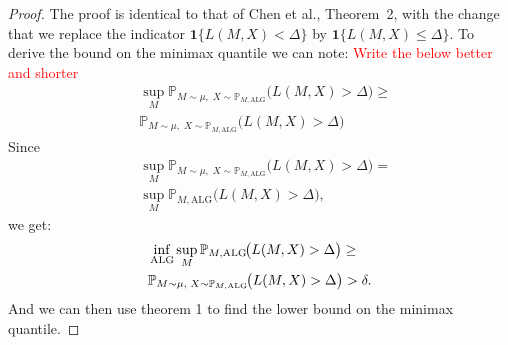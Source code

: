 \documentclass[conference]{IEEEtran}
\newtheorem{definition}{Definition}
\begin{document}
\begin{proof}
The proof is identical to that of Chen et al., Theorem~2, with the change that we replace the indicator $\mathbf{1}\{L(M,X)<\Delta\}$ by $\mathbf{1}\{L(M,X)\le \Delta\}$.
To derive the bound on the minimax quantile we can note:
\textcolor{red}{Write the below better and shorter}
\begin{align*}
    &\sup_{M} \mathbb{P}_{M\sim\mu,\;X\sim \mathbb{P}_{M,\mathrm{ALG}}}
   \!\bigl(L(M,X)>\Delta\bigr)
   \geq
   \\ &\mathbb{P}_{M\sim\mu,\;X\sim \mathbb{P}_{M,\mathrm{ALG}}}
   \!\bigl(L(M,X)>\Delta\bigr)
\end{align*}
Since 
\begin{align*}
&\sup_{M} \mathbb{P}_{M\sim\mu,\;X\sim \mathbb{P}_{M,\mathrm{ALG}}}
   \!\bigl(L(M,X)>\Delta\bigr) =  \\&\sup_{M}\mathbb{P}_{M,\mathrm{ALG}}
   \!\bigl(L(M,X)>\Delta\bigr),
\end{align*}
we get:
\begin{align*}
    &\inf_{\textup{ALG}}\sup_{M}  \mathbb{P}_{M,\mathrm{ALG}}
   \!\bigl(L(M,X)>\Delta\bigr)
   \geq
   \\ &\mathbb{P}_{M\sim\mu,\;X\sim \mathbb{P}_{M,\mathrm{ALG}}}
   \!\bigl(L(M,X)>\Delta\bigr) > \delta. 
\end{align*}
And we can then use theorem 1 to find the lower bound on the minimax quantile.

\end{proof}

\end{document}

